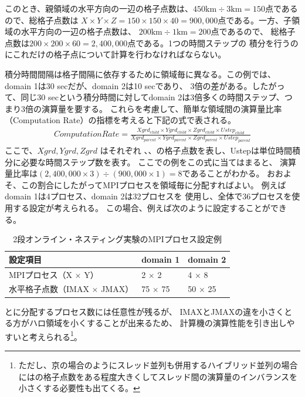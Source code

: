 このとき、親領域の水平方向の一辺の格子点数は、$450 \mathrm{km} \div 3 \mathrm{km} = 150$点であるので、総格子点数は
$X \times Y \times Z = 150 \times 150 \times 40 = 900,000$点である。一方、子領域の水平方向の一辺の格子点数は、
$200 \mathrm{km} \div 1 \mathrm{km} = 200$点であるので、
総格子点数は$200 \times 200 \times 60 = 2,400,000$点である。1つの時間ステップの
積分を行うのにこれだけの格子点について計算を行わなければならない。

積分時間間隔は格子間隔に依存するために領域毎に異なる。この例では、domain 1は30 secだが、domain 2は10 secであり、
3倍の差がある。したがって、同じ30 secという積分時間に対してdomain 2は3倍多くの時間ステップ、つまり3倍の演算量を要する。
これらを考慮して、簡単な領域間の演算量比率（Computation Rate）の指標を考えると下記の式で表される。
\begin{eqnarray}
ComputationRate=\frac{Xgrd_{child} \times Ygrd_{child} \times Zgrd_{child} \times Ustep_{child}}
                     {Xgrd_{parent} \times Ygrd_{parent} \times Zgrd_{parent} \times Ustep_{parent}} \nonumber
\end{eqnarray}
ここで、$Xgrd, Ygrd, Zgrd$ はそれぞれ{\XDIR} 、{\YDIR}、{\ZDIR}の格子点数を表し、Ustepは単位時間積分に必要な時間ステップ数を表す。
ここでの例をこの式に当てはまると、
演算量比率は$(2,400,000 \times 3) \div (900,000 \times 1) = 8$であることがわかる。
おおよそ、この割合にしたがってMPIプロセスを領域毎に分配すればよい。
例えばdomain 1は4プロセス、domain 2は32プロセスを
使用し、全体で36プロセスを使用する設定が考えられる。
この場合、例えば次のように設定することができる。

\begin{table}[htb]
\begin{center}
\caption{2段オンライン・ネスティング実験のMPIプロセス設定例}
\begin{tabularx}{150mm}{|l|l|X|} \hline
 \rowcolor[gray]{0.9} 設定項目 & domain 1 & domain 2 \\ \hline
 MPIプロセス（X $\times$ Y） & 2 $\times$ 2 & 4 $\times$ 8 \\ \hline
 水平格子点数（IMAX $\times$ JMAX） & 75 $\times$ 75 & 50 $\times$ 25 \\ \hline
\end{tabularx}
\label{tab:nest_proc_guide2}
\end{center}
\end{table}

{\XDIR} と{\YDIR}に分配するプロセス数には任意性が残るが、
IMAXとJMAXの違を小さくとる方がハロ領域を小くすることが出来るため、
計算機の演算性能を引き出しやすいと考えられる\footnote{ただし、京の場合のようにスレッド並列も併用するハイブリッド並列の場合には{\YDIR}の格子点数をある程度大きくしてスレッド間の演算量のインバランスを小さくする必要性も出てくる。}。

